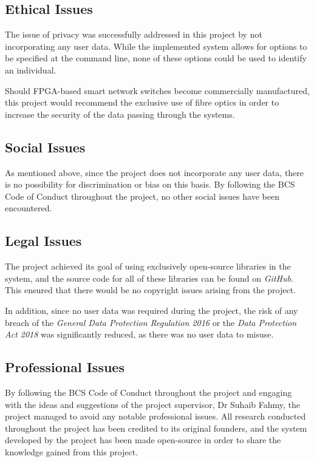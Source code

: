 
\subsection{Ethical Issues}
The issue of privacy was successfully addressed in this project by not incorporating any user data. While the implemented system allows for options to be specified at the command line, none of these options could be used to identify an individual.

Should FPGA-based smart network switches become commercially manufactured, this project would recommend the exclusive use of fibre optics in order to increase the security of the data passing through the systems.

\subsection{Social Issues}
As mentioned above, since the project does not incorporate any user data, there is no possibility for discrimination or bias on this basis.
By following the BCS Code of Conduct throughout the project, no other social issues have been encountered.

\subsection{Legal Issues}
The project achieved its goal of using exclusively open-source libraries in the system, and the source code for all of these libraries can be found on \textit{GitHub}.
This ensured that there would be no copyright issues arising from the project.

In addition, since no user data was required during the project, the risk of any breach of the \textit{General Data Protection Regulation 2016} \cite{eu_2016_679} or the \textit{Data Protection Act 2018} \cite{uk_dpa_2018} was significantly reduced, as there was no user data to misuse.

\subsection{Professional Issues}

By following the BCS Code of Conduct \cite{bcs_code_of_conduct} throughout the project and engaging with the ideas and suggestions of the project supervisor, Dr Suhaib Fahmy, the project managed to avoid any notable professional issues. All research conducted throughout the project has been credited to its original founders, and the system developed by the project has been made open-source in order to share the knowledge gained from this project.

